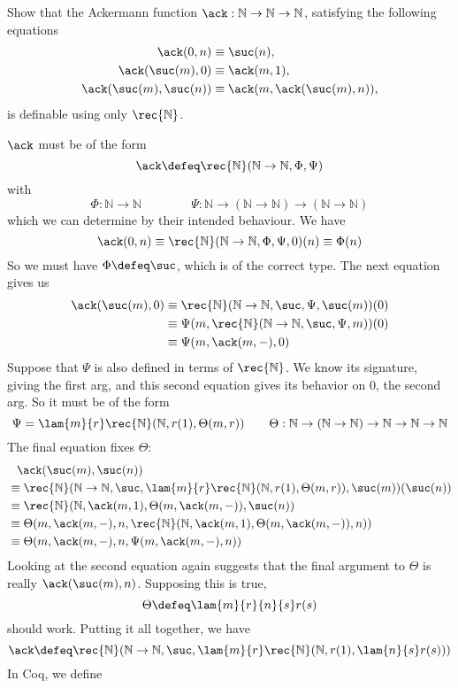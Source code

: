 Show that the Ackermann function $\ack : \mathbb{N} \to
\mathbb{N} \to \mathbb{N}$,
satisfying the following equations
\begin{align*}
  \ack(0, n) &\equiv \suc(n), \\
  \ack(\suc(m), 0) &\equiv \ack(m, 1), \\
  \ack(\suc(m), \suc(n)) &\equiv \ack(m, \ack(\suc(m), n)),
\end{align*}
is definable using only $\rec{\mathbb{N}}$.


\soln 
$\ack$ must be of the form
\[
  \ack \defeq 
  \rec{\mathbb{N}}(\mathbb{N} \to \mathbb{N}, \Phi, \Psi)
\]
with
\[
  \Phi : \mathbb{N} \to \mathbb{N}
  \qquad\qquad
  \Psi : \mathbb{N} \to (\mathbb{N} \to \mathbb{N}) \to (\mathbb{N} \to
  \mathbb{N})
\]
which we can determine by their intended behaviour.  We have
\[
  \ack(0, n)
  \equiv
  \rec{\mathbb{N}}(\mathbb{N} \to \mathbb{N}, \Phi, \Psi, 0)(n)
  \equiv
  \Phi(n)
\]
So we must have $\Phi \defeq \suc$, which is of the correct type.  The next
equation gives us
\begin{align*}
  \ack(\suc(m), 0)
  &\equiv
  \rec{\mathbb{N}}(\mathbb{N} \to \mathbb{N}, \suc, \Psi, \suc(m))(0)
  \\&\equiv
  \Psi(m, \rec{\mathbb{N}}(\mathbb{N} \to \mathbb{N}, \suc, \Psi, m))(0)
  \\&\equiv
  \Psi(m, \ack(m, -), 0)
\end{align*}
Suppose that $\Psi$ is also defined in terms of $\rec{\mathbb{N}}$.  We know
its signature, giving the first arg, and this second equation gives its
behavior on $0$, the second arg.  So it must be of the form
\[
  \Psi = 
  \lam{m}{r} \rec{\mathbb{N}}(\mathbb{N}, r(1), \Theta(m, r))
  \qquad
  \Theta : \mathbb{N} \to (\mathbb{N} \to \mathbb{N}) \to \mathbb{N} \to \mathbb{N} \to \mathbb{N}
\]
The final equation fixes $\Theta$:
\begin{align*}
  &\phantom{\equiv} \ack(\suc(m), \suc(n))
  \\&\equiv
  \rec{\mathbb{N}}(\mathbb{N} \to \mathbb{N}, \suc, 
  \lam{m}{r} \rec{\mathbb{N}}(\mathbb{N}, r(1), \Theta(m, r)),
  \suc(m))(\suc(n))
  \\&\equiv
  \rec{\mathbb{N}}(\mathbb{N}, \ack(m, 1), \Theta(m, \ack(m, -)), \suc(n))
  \\&\equiv
  \Theta(m, \ack(m, -), n, 
  \rec{\mathbb{N}}(\mathbb{N}, \ack(m, 1), \Theta(m, \ack(m, -)), n)
  )
  \\&\equiv
  \Theta(m, \ack(m, -), n, 
  \Psi(m, \ack(m, -), n)
  )
\end{align*}
Looking at the second equation again suggests that the final argument to
$\Theta$ is really $\ack(\suc(m), n)$.  Supposing this is true,
\[
    \Theta \defeq \lam{m}{r}{n}{s}r(s)
\]
should work.  Putting it all together, we have
\[
  \ack \defeq 
  \rec{\mathbb{N}}(\mathbb{N} \to \mathbb{N}, 
  \suc,
  \lam{m}{r}\rec{\mathbb{N}}(\mathbb{N}, 
                             r(1), 
                             \lam{n}{s}r(s))
  )
\]
In Coq, we define 

